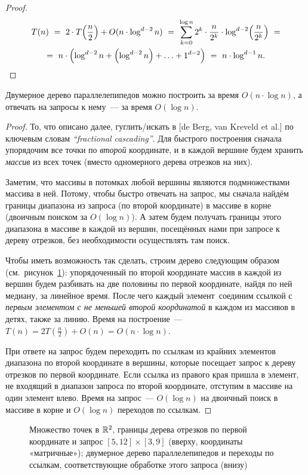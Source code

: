 \documentclass[a4paper,11pt]{article}
\begin{document}
\begin{proof}  \begin{multline*}
  T(n)\ =\ 2 \cdot T \lr*{\frac n 2} + O (n \cdot \log^{d-2} n)\ =\ 
  \sum_{k = 0}^{\log n} 2^k \cdot \frac{n}{2^k} \cdot
    \log^{d-2} \lr*{\frac{n}{2^k}}\ = \\
  =\ n \cdot \lr*{\log^{d-2} n + \lr*{\log^{d-2} n}
    + \ldots + 1^{d-2}}
  \ =\ n \cdot \log^{d-1} n.
\end{multline*}  \end{proof}

\begin{theorem}
  Двумерное дерево параллелепипедов можно построить за время
  \(O (n \cdot \log n)\), а отвечать на запросы к нему~—
  за время \(O (\log n)\).
\end{theorem}

\begin{proof}
  То, что описано далее, гуглить/искать в [de Berg, van Kreveld et al.]
  по ключевым словам \emph{``fractional cascading''}.
  Для быстрого построения сначала упорядочим все точки по
  \emph{второй} координате, и в каждой вершине будем хранить \emph{массив}
  из всех точек (вместо одномерного дерева отрезков на них).

  Заметим, что массивы в потомках любой вершины являются подмножествами
  массива в ней. Потому, чтобы быстро отвечать на запрос,
  мы сначала найдём границы диапазона из запроса
  (по второй координате) в массиве в корне (двоичным поиском
  за \(O (\log n)\)). А затем будем получать границы этого диапазона
  в массиве в каждой из вершин, посещённых нами при запросе к дереву
  отрезков, без необходимости осуществлять там поиск.

  Чтобы иметь возможность так сделать, строим дерево следующим образом
  (см.~рисунок~\ref{fig:range-tikz}): упорядоченный по второй координате массив
  в каждой из вершин будем разбивать на две половины по первой координате,
  найдя по ней медиану, за линейное время. После чего каждый элемент\
  соединим ссылкой с \emph{первым элементом с не меньшей второй координатой}
  в каждом из массивов в детях, также за линию. Время на построение~—
  \(T(n) = 2T(\frac n 2) + O(n) = O(n \cdot \log n)\).

  При ответе на запрос будем переходить по ссылкам из крайних элементов
  диапазона по второй координате в вершины, которые посещает запрос
  к дереву отрезков по первой координате. Если ссылка из правого края
  пришла в элемент, не входящий в диапазон запроса по второй координате,
  отступим в массиве на один элемент влево. Время на запрос~— \(O (\log n)\)
  на двоичный поиск в массиве в корне и \(O (\log n)\) переходов по ссылкам.
\end{proof}

\begin{figure} \centering
  

  \caption{Множество точек в \(\mathbb R^2\), границы дерева отрезков по первой координате
    и запрос \([5, 12] \times [3, 9]\) (вверху, координаты «матричные»);
    двумерное дерево параллелепипедов и переходы по ссылкам, соответствующие
    обработке этого запроса (внизу)}
  \label{fig:range-tikz}
\end{figure}
\end{document}
